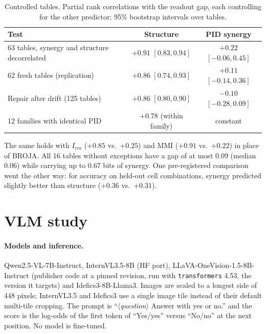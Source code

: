 \begin{table}[h]
\centering\small
\caption{Controlled tables. Partial rank correlations with the readout gap, each controlling
for the other predictor; 95\% bootstrap intervals over tables.}
\label{tab:sup_controlled}
\begin{tabular}{lcc}
\toprule
Test & Structure & PID synergy \\
\midrule
63 tables, synergy and structure decorrelated & $+0.91$ $[0.83, 0.94]$ & $+0.22$ $[-0.06, 0.45]$ \\
62 fresh tables (replication) & $+0.86$ $[0.74, 0.93]$ & $+0.11$ $[-0.14, 0.36]$ \\
Repair after drift (125 tables) & $+0.86$ $[0.80, 0.90]$ & $-0.10$ $[-0.28, 0.09]$ \\
12 families with identical PID & $+0.78$ (within family) & constant \\
\bottomrule
\end{tabular}
\end{table}

\noindent
The same holds with $I_{\mathrm{ccs}}$ ($+0.85$ vs.\ $+0.25$) and MMI ($+0.91$ vs.\ $+0.22$)
in place of BROJA. All 16 tables without exceptions have a gap of at most 0.09 (median 0.06)
while carrying up to 0.67 bits of synergy. One pre-registered comparison went the other way:
for accuracy on held-out cell combinations, synergy predicted slightly better than structure
($+0.36$ vs.\ $+0.31$).

\section{VLM study}
\label{sup:vlm}

\paragraph{Models and inference.}
Qwen2.5-VL-7B-Instruct, InternVL3.5-8B (HF port), LLaVA-OneVision-1.5-8B-Instruct (publisher
code at a pinned revision, run with \texttt{transformers} 4.53, the version it targets) and
Idefics3-8B-Llama3. Images are scaled to a longest side of 448 pixels; InternVL3.5 and
Idefics3 use a single image tile instead of their default multi-tile cropping. The prompt is
``\textit{$\langle$question$\rangle$} Answer with yes or no.'' and the score is the log-odds of
the first token of ``Yes/yes'' versus ``No/no'' at the next position. No model is fine-tuned.

